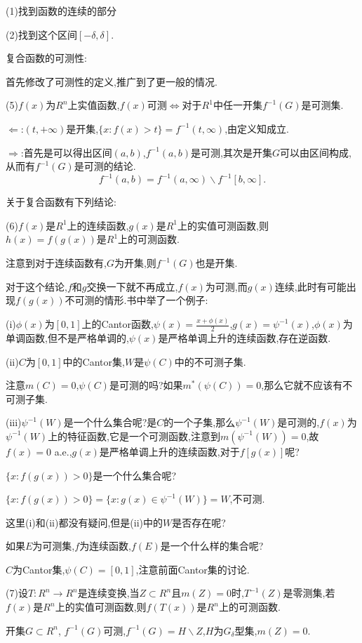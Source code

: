 \documentclass[12pt,a4paper,openany]{book}
\begin{document}
(1)找到函数的连续的部分

(2)找到这个区间$[-\delta,\delta]$.

复合函数的可测性:

首先修改了可测性的定义,推广到了更一般的情况.

(5)$f(x)$为$R^n$上实值函数,$f(x)$可测$\Leftrightarrow$对于$R^1$中任一开集$f^{-1}(G)$是可测集.

$\Leftarrow$:$(t,+\infty)$是开集,$\{x:f(x)>t\}=f^{-1}(t,\infty)$,由定义知成立.

$\Rightarrow$:首先是可以得出区间$(a,b)$,$f^{-1}(a,b)$是可测,其次是开集$G$可以由区间构成,从而有$f^{-1}(G)$是可测的结论.
\[
f^{-1}(a,b)=f^{-1}(a,\infty) \backslash f^{-1}[b,\infty].
\]

关于复合函数有下列结论:

(6)$f(x)$是$R^1$上的连续函数,$g(x)$是$R^1$上的实值可测函数,则$h(x)=f(g(x))$是$R^1$上的可测函数.

注意到对于连续函数有,$G$为开集,则$f^{-1}(G)$也是开集.

对于这个结论,$f$和$g$交换一下就不再成立,$f(x)$为可测,而$g(x)$连续,此时有可能出现$f(g(x))$不可测的情形.书中举了一个例子:

(i)$\phi(x)$为$[0,1]$上的Cantor函数,$\psi(x)=\frac{x+\phi(x)}{2}$,$g(x)=\psi^{-1}(x)$,$\phi(x)$为单调函数,但不是严格单调的,$\psi(x)$是严格单调上升的连续函数,存在逆函数.

(ii)$C$为$[0,1]$中的Cantor集,$W$是$\psi(C)$中的不可测子集.

注意$m(C) = 0$,$\psi(C)$是可测的吗?如果$m^*(\psi(C))=0$,那么它就不应该有不可测子集.

(iii)$\psi^{-1}(W)$是一个什么集合呢?是$C$的一个子集,那么$\psi^{-1}(W)$是可测的,$f(x)$为$\psi^{-1}(W)$上的特征函数,它是一个可测函数,注意到$m(\psi^{-1}(W)) = 0$,故$f(x)=0$ a.e.,$g(x)$是严格单调上升的连续函数,对于$f[g(x)]$呢?

$\{x: f(g(x)) > 0\}$是一个什么集合呢?

$\{x : f(g(x)) > 0\} = \{x: g(x) \in \psi^{-1}(W)\}=W$,不可测.

这里(i)和(ii)都没有疑问,但是(ii)中的$W$是否存在呢?

如果$E$为可测集,$f$为连续函数,$f(E)$是一个什么样的集合呢?

$C$为Cantor集,$\psi(C)=[0,1]$,注意前面Cantor集的讨论.

(7)设$T:R^n\rightarrow R^n$是连续变换,当$Z \subset R^n$且$m(Z) = 0$时,$T^{-1}(Z)$是零测集,若$f(x)$是$R^n$上的实值可测函数,则$f(T(x))$是$R^n$上的可测函数.

开集$G \subset R^n$, $f^{-1}(G)$可测,$f^{-1}(G) = H \backslash Z$,$H$为$G_{\delta}$型集,$m(Z)=0$.
\end{document}
